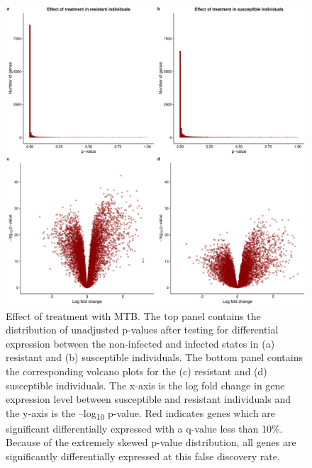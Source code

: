 \documentclass[fleqn,10pt]{wlscirep}
\begin{document}
\begin{figure}[ht]
\centering
\includegraphics[width=\linewidth]{../figure/limma-supp.pdf}
\caption{
Effect of treatment with MTB. The top panel contains the distribution
of unadjusted p-values after testing for differential expression
between the non-infected and infected states in (a) resistant and (b)
susceptible individuals. The bottom panel contains the corresponding
volcano plots for the (c) resistant and (d) susceptible individuals.
The x-axis is the log fold change in gene expression level between
susceptible and resistant individuals and the y-axis is the
–log\textsubscript{10} p-value. Red indicates genes which are
significant differentially expressed with a q-value less than 10\%.
Because of the extremely skewed p-value distribution, all genes are
significantly differentially expressed at this false discovery rate.
}
\label{fig:limma-supp}
\end{figure}
\end{document}
